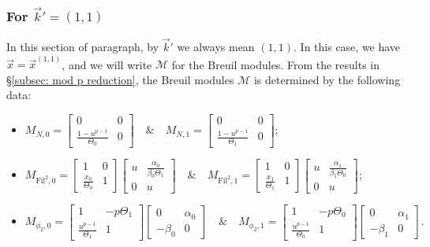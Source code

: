 \documentclass[11pt]{amsart}
\theoremstyle{definition}
\numberwithin{equation}{subsection}
\theoremstyle{plain}
\theoremstyle{plain}
\theoremstyle{plain}
\theoremstyle{plain}
\theoremstyle{plain}
\theoremstyle{plain}
\theoremstyle{plain}
\theoremstyle{plain}
\theoremstyle{plain}
\theoremstyle{plain}
\theoremstyle{plain}
\theoremstyle{plain}
\theoremstyle{definition}
\theoremstyle{definition}
\theoremstyle{definition}
\theoremstyle{remark}
\renewcommand{\(}{\textup{(}}
\renewcommand{\)}{\textup{)}}
\newcommand{\cM}{\mathcal{M}}
\newcommand{\Fil}{\mathrm{Fil}}
\newcommand{\vx}{\vec{x}}
\newcommand{\vk}{\vec{k}}
\begin{document}
\subsubsection{\textbf{For $\vk'=(1,1)$}}\label{subsubsec: vr=(2,2), vk=(1,1)}
In this section of paragraph, by $\vk'$ we always mean $(1,1)$. In this case, we have $\vx=\vx^{(1,1)}$, and we will write $\cM$ for the Breuil modules. From the results in \S\ref{subsec: mod p reduction}, the Breuil modules $\cM$ is determined by the following data:
\begin{itemize}[leftmargin=*]
  \item $M_{N,0}=
  \begin{bmatrix}
    0 & 0 \\
    \frac{1-u^{p-1}}{\Theta_0} & 0
  \end{bmatrix}\quad\&\quad
M_{N,1}=
  \begin{bmatrix}
    0 & 0 \\
    \frac{1-u^{p-1}}{\Theta_1} & 0
  \end{bmatrix}$;
  \item $M_{\Fil^2,0}=
  \begin{bmatrix}
    1 & 0 \\
    \frac{x_0}{\Theta_0} & 1
  \end{bmatrix}
  \begin{bmatrix}
    u & \frac{\alpha_0}{\beta_0\Theta_1} \\
    0 & u
  \end{bmatrix}\quad\&\quad M_{\Fil^2,1}=
  \begin{bmatrix}
    1 & 0 \\
    \frac{x_1}{\Theta_1} & 1
  \end{bmatrix}
  \begin{bmatrix}
    u & \frac{\alpha_1}{\beta_1\Theta_0} \\
    0 & u
  \end{bmatrix}$;
  \item $M_{\phi_2,0}=
  \begin{bmatrix}
    1 & -p\Theta_1 \\
    \frac{u^{p-1}}{\Theta_1} & 1
  \end{bmatrix}
  \begin{bmatrix}
    0 & \alpha_0\\
    -\beta_0 & 0
  \end{bmatrix}\quad\&\quad M_{\phi_2,1}=
  \begin{bmatrix}
    1 & -p\Theta_0 \\
    \frac{u^{p-1}}{\Theta_0} & 1
  \end{bmatrix}
  \begin{bmatrix}
    0 & \alpha_1\\
    -\beta_1 & 0
  \end{bmatrix}.$
\end{itemize}
\end{document}
